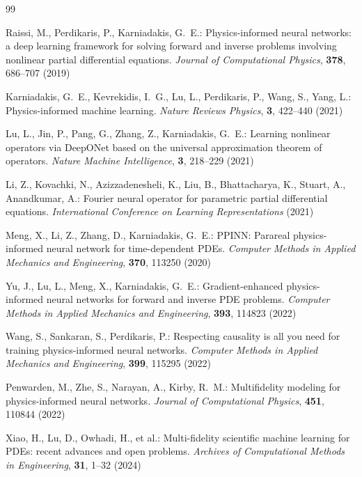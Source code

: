\documentclass[preprint,12pt]{elsarticle}
\theoremstyle{definition}
\numberwithin{equation}{section}
\begin{document}
\begin{thebibliography}{99}

Raissi, M., Perdikaris, P., Karniadakis, G.~E.:
Physics-informed neural networks: a deep learning framework for solving forward and inverse problems involving nonlinear partial differential equations.
\textit{Journal of Computational Physics},
\textbf{378}, 686--707 (2019)

Karniadakis, G.~E., Kevrekidis, I.~G., Lu, L., Perdikaris, P., Wang, S., Yang, L.:
Physics-informed machine learning.
\textit{Nature Reviews Physics},
\textbf{3}, 422--440 (2021)

Lu, L., Jin, P., Pang, G., Zhang, Z., Karniadakis, G.~E.:
Learning nonlinear operators via DeepONet based on the universal approximation theorem of operators.
\textit{Nature Machine Intelligence},
\textbf{3}, 218--229 (2021)

Li, Z., Kovachki, N., Azizzadenesheli, K., Liu, B., Bhattacharya, K., Stuart, A., Anandkumar, A.:
Fourier neural operator for parametric partial differential equations.
\textit{International Conference on Learning Representations} (2021)

Meng, X., Li, Z., Zhang, D., Karniadakis, G.~E.:
PPINN: Parareal physics-informed neural network for time-dependent PDEs.
\textit{Computer Methods in Applied Mechanics and Engineering},
\textbf{370}, 113250 (2020)

Yu, J., Lu, L., Meng, X., Karniadakis, G.~E.:
Gradient-enhanced physics-informed neural networks for forward and inverse PDE problems.
\textit{Computer Methods in Applied Mechanics and Engineering},
\textbf{393}, 114823 (2022)

Wang, S., Sankaran, S., Perdikaris, P.:
Respecting causality is all you need for training physics-informed neural networks.
\textit{Computer Methods in Applied Mechanics and Engineering},
\textbf{399}, 115295 (2022)

Penwarden, M., Zhe, S., Narayan, A., Kirby, R.~M.:
Multifidelity modeling for physics-informed neural networks.
\textit{Journal of Computational Physics},
\textbf{451}, 110844 (2022)

Xiao, H., Lu, D., Owhadi, H., et al.:
Multi-fidelity scientific machine learning for PDEs: recent advances and open problems.
\textit{Archives of Computational Methods in Engineering},
\textbf{31}, 1--32 (2024)


\end{thebibliography}
\end{document}
